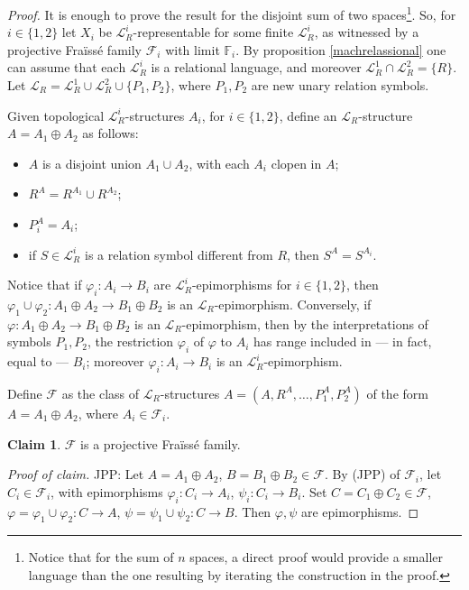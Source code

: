 \documentclass[12pt,twoside,a4paper]{amsart}
\theoremstyle{plain}
\theoremstyle{definition}
\newtheorem{claim}{Claim}[theorem]
\begin{document}
\begin{proof}
It is enough to prove the result for the disjoint sum of two spaces\footnote{Notice that for the sum of $n$ spaces, a direct proof would provide a smaller language than the one resulting by iterating the construction in the proof.}.
So, for $i\in\{ 1,2\} $ let $X_i$ be $ \mathcal L_R^i$-representable for some finite $ \mathcal L_R^i$, as witnessed by a projective Fra\"iss\'e family $ \mathcal F_i$ with limit $ \mathbb F_i$.
By proposition \ref{machrelassional} one can assume that each $ \mathcal L_R^i$ is a relational language, and moreover $ \mathcal L_R^1\cap \mathcal L_R^2=\{ R\} $.
Let $ \mathcal L_R= \mathcal L_R^1\cup \mathcal L_R^2\cup\{ P_1,P_2\} $, where $P_1,P_2$ are new unary relation symbols.

Given topological $ \mathcal L_R^i$-structures $A_i$, for $i\in\{ 1,2\} $, define an $ \mathcal L_R$-structure $A=A_1\oplus A_2$ as follows:

\begin{itemize}
\item $A$ is a disjoint union $A_1\cup A_2$, with each $A_i$ clopen in $A$;
\item $R^A=R^{A_1}\cup R^{A_2}$;
\item $P_i^A=A_i$;
\item if $S\in \mathcal L_R^i$ is a relation symbol different from $R$, then $S^A=S^{A_i}$.
\end{itemize}
Notice that if $ {\varphi}_i:A_i\to B_i$ are $ \mathcal L_R^i$-epimorphisms for $i\in\{ 1,2\} $, then $ {\varphi}_1\cup {\varphi}_2:A_1\oplus A_2\to B_1\oplus B_2$ is an $ \mathcal L_R$-epimorphism.
Conversely, if $ {\varphi} :A_1\oplus A_2\to B_1\oplus B_2$ is an $ \mathcal L_R$-epimorphism, then by the interpretations of symbols $P_1,P_2$, the restriction $ {\varphi}_i$ of $ {\varphi} $ to $A_i$ has range included in --- in fact, equal to --- $B_i$; moreover $ {\varphi}_i:A_i\to B_i$ is an $ \mathcal L_R^i$-epimorphism.

Define $ \mathcal F $ as the class of $ \mathcal L_R$-structures $A=(A,R^A,\ldots ,P_1^A,P_2^A)$ of the form $A=A_1\oplus A_2$, where $A_i\in \mathcal F_i$.

\begin{claim}
$ \mathcal F $ is a projective Fra\"iss\'e family.
\end{claim}

{\it Proof of claim.}
JPP:
Let $A=A_1\oplus A_2$, $B=B_1\oplus B_2\in \mathcal F $.
By (JPP) of $ \mathcal F_i$, let $C_i\in \mathcal F_i$, with epimorphisms $ {\varphi}_i:C_i\to A_i$, $\psi_i:C_i\to B_i$.
Set $C=C_1\oplus C_2\in \mathcal F $, $ {\varphi} = {\varphi}_1\cup {\varphi}_2:C\to A$, $\psi =\psi_1\cup\psi_2:C\to B$.
Then $ {\varphi} ,\psi $ are epimorphisms.


\end{proof}
\end{document}
